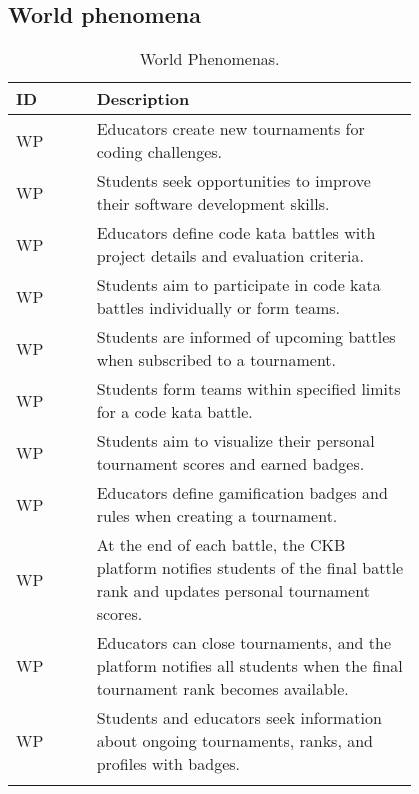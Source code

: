 \subsection{World phenomena}
\label{subsec:world_phenomena}%
\setcounter{wp}{1}
\newcommand{\cwp}{\thewp\stepcounter{wp}}
\begin{center}
    \begin{longtable}{ |l|p{0.8\linewidth}| }
        \hline
        \textbf{ID} & \textbf{Description}                                                \\
        \hline
        WP\cwp      & Educators create new tournaments for coding challenges.                          \\
        \hline
        WP\cwp      & Students seek opportunities to improve their software development skills.   \\
        \hline
        WP\cwp      & Educators define code kata battles with project details and evaluation criteria. \\
        \hline
        WP\cwp      & Students aim to participate in code kata battles individually or form teams.          \\
        \hline
        WP\cwp      & Students are informed of upcoming battles when subscribed to a tournament.                \\
        \hline
        WP\cwp      & Students form teams within specified limits for a code kata battle.                 \\
        \hline
        WP\cwp      & Students aim to visualize their personal tournament scores and earned badges.         \\
        \hline
        WP\cwp      & Educators define gamification badges and rules when creating a tournament.      \\
        \hline
        WP\cwp      & At the end of each battle, the CKB platform notifies students of the final battle rank and updates personal tournament scores.                       \\
        \hline
        WP\cwp      & Educators can close tournaments, and the platform notifies all students when the final tournament rank becomes available. \\
        \hline
        WP\cwp      & Students and educators seek information about ongoing tournaments, ranks, and profiles with badges.                      \\
        \hline
        \caption{World Phenomenas.}
        \label{tab:worldph_tab}%
    \end{longtable}
\end{center}
\newpage

